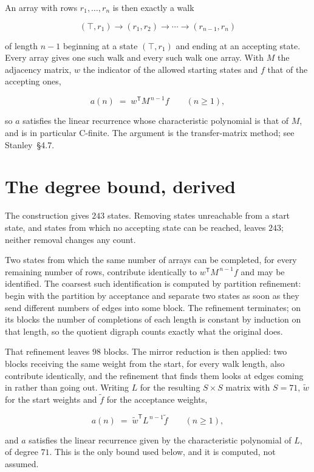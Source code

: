 \documentclass[11pt]{article}
\theoremstyle{definition}
\begin{document}
An array with rows $r_1,\dots,r_n$ is then exactly a walk

\[(\top,r_1) \to (r_1,r_2) \to \cdots \to (r_{n-1},r_n)\]

of length $n-1$ beginning at a state $(\top,r_1)$ and ending at an accepting state. Every array gives one such walk and every such walk one array. With $M$ the adjacency matrix, $w$ the indicator of the allowed starting states and $f$ that of the accepting ones,

\[a(n) \;=\; w^{\mathsf T} M^{\,n-1} f \qquad (n \ge 1),\]

so $a$ satisfies the linear recurrence whose characteristic polynomial is that of $M$, and is in particular C-finite. The argument is the transfer-matrix method; see Stanley~\S4.7.

\section{The degree bound, derived}

The construction gives $243$ states. Removing states unreachable from a start state, and states from which no accepting state can be reached, leaves $243$; neither removal changes any count.

Two states from which the same number of arrays can be completed, for every remaining number of rows, contribute identically to $w^{\mathsf T}M^{\,n-1}f$ and may be identified. The coarsest such identification is computed by partition refinement: begin with the partition by acceptance and separate two states as soon as they send different numbers of edges into some block. The refinement terminates; on its blocks the number of completions of each length is constant by induction on that length, so the quotient digraph counts exactly what the original does.

That refinement leaves $98$ blocks. The mirror reduction is then applied: two blocks receiving the same weight from the start, for every walk length, also contribute identically, and the refinement that finds them looks at edges coming in rather than going out. Writing $L$ for the resulting $S \times S$ matrix with $S = 71$, $\tilde w$ for the start weights and $\tilde f$ for the acceptance weights,

\[a(n) \;=\; \tilde w^{\mathsf T} L^{\,n-1} \tilde f \qquad (n \ge 1),\]

and $a$ satisfies the linear recurrence given by the characteristic polynomial of $L$, of degree $71$. This is the only bound used below, and it is computed, not assumed.
\end{document}
